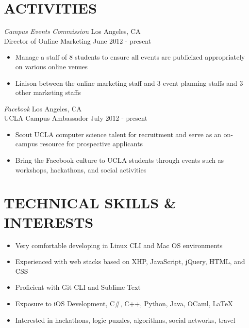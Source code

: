 \documentclass{res}
\begin{document}
\begin{resume}
\section{ACTIVITIES}
\vspace{6pt}
  {\sl Campus Events Commission} \hfill Los Angeles, CA \\
  Director of Online Marketing \hfill June 2012 - present
  \begin{itemize} \itemsep -2pt
    \item Manage a staff of 8 students to ensure all events are publicized appropriately on various online venues
    \item Liaison between the online marketing staff and 3 event planning staffs and 3 other marketing staffs
  \end{itemize} \vspace{-8pt}

  {\sl Facebook} \hfill Los Angeles, CA \\
  UCLA Campus Ambassador \hfill July 2012 - present
  \begin{itemize} \itemsep -2pt
    \item Scout UCLA computer science talent for recruitment and serve as an on-campus resource for prospective applicants
    \item Bring the Facebook culture to UCLA students through events such as workshops,  hackathons, and social activities
  \end{itemize} \vspace{-6pt}

\section{TECHNICAL SKILLS \& INTERESTS}
\vspace{0.2in}
  \begin{itemize}  \itemsep -2pt
    \item Very comfortable developing in Linux CLI and Mac OS environments
    \item Experienced with web stacks based on XHP, JavaScript, jQuery, HTML, and CSS
    \item Proficient with Git CLI and Sublime Text
    \item Exposure to iOS Development, C\#, C++, Python, Java, OCaml, LaTeX
    \item Interested in hackathons, logic puzzles, algorithms, social networks, travel
  \end{itemize}
\end{resume}
\end{document}
